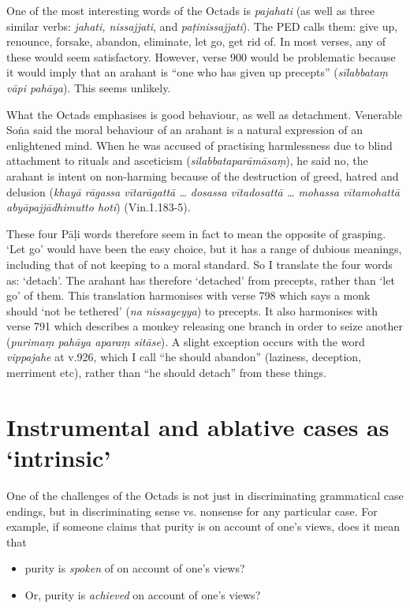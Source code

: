 One of the most interesting words of the Octads is \textit{pajahati} (as well as three similar verbs: \textit{jahati, nissajjati}, and \textit{paṭinissajjati}). The PED calls them: give up, renounce, forsake, abandon, eliminate, let go, get rid of. In most verses, any of these would seem satisfactory. However, verse 900 would be problematic because it would imply that an arahant is ``one who has given up precepts'' (\textit{sīlabbataṃ vāpi pahāya}). This seems unlikely. 

What the Octads emphasises is good behaviour, as well as detachment. Venerable So\.na said the moral behaviour of an arahant is a natural expression of an enlightened mind. When he was accused of practising harmlessness due to blind attachment to rituals and asceticism (\textit{silabbataparāmāsaṃ}), he said no, the arahant is intent on non-harming because of the destruction of greed, hatred and delusion (\textit{khayā rāgassa vītarāgattā \ldots{} dosassa vītadosattā \ldots{} mohassa vītamohattā abyāpajjādhimutto hoti}) (Vin.1.183-5).

These four P\=a\d{l}i words therefore seem in fact to mean the opposite of grasping. `Let go' would have been the easy choice, but it has a range of dubious meanings, including that of not keeping to a moral standard. So I translate the four words as: `detach'. The arahant has therefore `detached' from precepts, rather than `let go' of them. This translation harmonises with verse 798 which says a monk should `not be tethered' (\textit{na nissayeyya}) to precepts. It also harmonises with verse 791 which describes a monkey releasing one branch in order to seize another (\textit{purimaṃ pahāya aparaṃ sitāse}). A slight exception occurs with the word \textit{vippajahe} at v.926, which I call ``he should abandon'' (laziness, deception, merriment etc), rather than ``he should detach'' from these things. 

\section*{Instrumental and ablative cases as `intrinsic'}\label{transl-intrinsic}

One of the challenges of the Octads is not just in discriminating grammatical case endings, but in discriminating sense vs. nonsense for any particular case. For example, if someone claims that purity is on account of one's views, does it mean that

\begin{itemize}
\item purity is \emph{spoken} of on account of one's views?
\item Or, purity is \emph{achieved} on account of one's views?
\end{itemize}

